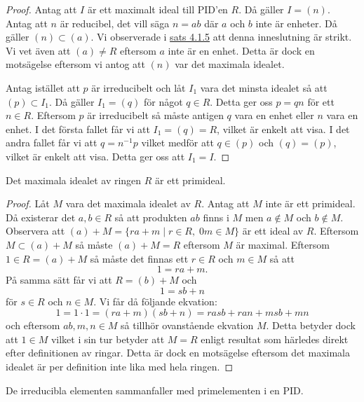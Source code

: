 \documentclass{article}
\theoremstyle{definition}
\begin{document}
\begin{proof}
  Antag att $I$ är ett maximalt ideal till PID'en $R$. Då gäller $I = (n)$. Antag att $n$ är reducibel, det vill säga 
  $n = ab$ där $a$ och $b$ inte är enheter. Då gäller $(n) \subset (a)$. Vi observerade i \hyperlink{inv}{sats 4.1.5} att denna inneslutning är strikt.
  Vi vet även att $(a) \neq R$ eftersom $a$ inte är en enhet. Detta är dock en motsägelse eftersom vi antog att $(n)$ var det maximala idealet.

  Antag istället att $p$ är irreducibelt och låt $I_1$ vara det minsta idealet så att $(p) \subset I_1$. Då gäller $I_1 = (q)$ för något $q \in R$. 
  Detta ger oss $p = qn$ för ett $n \in R$. Eftersom $p$ är irreducibelt så måste antigen $q$ vara en enhet eller $n$ vara en enhet. 
  I det första fallet får vi att $I_1 = (q) = R$, vilket är enkelt att visa. I det andra fallet får vi att $q = n^{-1}p$ vilket medför att 
  $q \in (p)$ och $(q) = (p)$, vilket är enkelt att visa. Detta ger oss att $I_1 = I$.
\end{proof}

\hypertarget{maxprim}{}
\begin{mylemma}{}{}
  Det maximala idealet av ringen $R$ är ett primideal.
\end{mylemma}

\begin{proof}
  Låt $M$ vara det maximala idealet av $R$. Antag att $M$ inte är ett primideal. Då existerar det $a, b \in R$ så att produkten 
  $ab$ finns i $M$ men $a \notin M$ och $b \notin M$. Observera att $(a) + M = \{ra + m \; | \; r \in R, \; 0m \in M\}$ är ett ideal av $R$. 
  Eftersom $M \subset (a) + M$ så måste $(a) + M = R$ eftersom $M$ är maximal. Eftersom $1 \in R = (a) + M$ så måste det finnas ett 
  $r \in R$ och $m \in M$ så att 
  \[1 = ra + m.\]
  På samma sätt får vi att $R = (b) + M$ och
  \[ 1 =  sb + n\]
  för $s \in R$ och $n \in M$. 
  Vi får då följande ekvation: 
  \[1 = 1 \cdot 1 = (ra + m)(sb + n) = rasb + ran + msb + mn\]
  och eftersom $ab, m, n \in M$ så tillhör ovanstående ekvation $M$. Detta betyder dock att $1 \in M$ vilket i sin tur betyder 
  att $M = R$ enligt resultat som härledes direkt efter definitionen av ringar. Detta är dock en motsägelse eftersom 
  det maximala idealet är per definition inte lika med hela ringen.
\end{proof}

\hypertarget{irprim}{}
\begin{mylemma}{}{}
  De irreducibla elementen sammanfaller med primelementen i en PID.
\end{mylemma}
\end{document}
